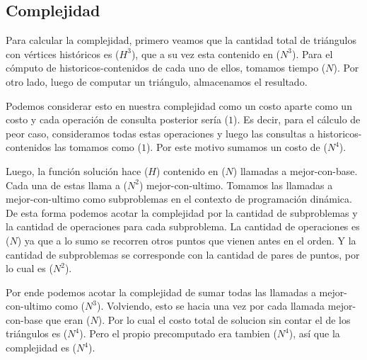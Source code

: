 \subsection{Complejidad}
\par{Para calcular la complejidad, primero veamos que la cantidad total de triángulos con vértices históricos es \bigo($H^3$), que a su vez esta contenido en \bigo($N^3$). Para el cómputo de historicos-contenidos de cada uno de ellos, tomamos tiempo \bigo($N$). Por otro lado, luego de computar un triángulo, almacenamos el resultado. }
\par{
Podemos considerar esto en nuestra complejidad como un costo aparte como un costo  y cada operación de consulta posterior sería \bigo($1$). Es decir, para el cálculo de peor caso, consideramos todas estas operaciones y luego las consultas a historicos-contenidos las tomamos como \bigo($1$). Por este motivo sumamos un costo de \bigo($N^4$).}
\par{
Luego, la función solución hace \bigo($H$) contenido en \bigo($N$) llamadas a mejor-con-base.
Cada una de estas llama a \bigo($N^2$) mejor-con-ultimo. Tomamos las llamadas a mejor-con-ultimo como subproblemas en el contexto de programación dinámica. De esta forma podemos acotar la complejidad por la cantidad de subproblemas y la cantidad de operaciones para cada subproblema. La cantidad de operaciones es \bigo($N$) ya que a lo sumo se recorren otros puntos que vienen antes en el orden. Y la cantidad de subproblemas se corresponde con la cantidad de pares de puntos, por lo cual es \bigo($N^2$).}
\par{Por ende podemos acotar la complejidad de sumar todas las llamadas a mejor-con-ultimo como \bigo($N^3$). Volviendo, esto se hacia una vez por cada llamada mejor-con-base que eran \bigo($N$). Por lo cual el costo total de solucion sin contar el  de los triángulos es \bigo($N^4$). Pero el propio precomputado era tambien \bigo($N^4$), así que la complejidad es \bigo($N^4$).}